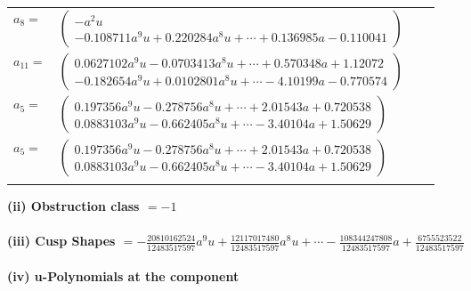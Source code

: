 \documentclass[1p]{elsarticle_modified}
\theoremstyle{definition}
\begin{document}
\begin{tabular}{m{7pt} m{180pt} m{7pt} m{180pt} }
\flushright $a_{8}=$&$\begin{pmatrix}- a^2 u\\-0.108711 a^{9} u+0.220284 a^{8} u+\cdots+0.136985 a-0.110041\end{pmatrix}$ \\
\flushright $a_{11}=$&$\begin{pmatrix}0.0627102 a^{9} u-0.0703413 a^{8} u+\cdots+0.570348 a+1.12072\\-0.182654 a^{9} u+0.0102801 a^{8} u+\cdots-4.10199 a-0.770574\end{pmatrix}$ \\
\flushright $a_{5}=$&$\begin{pmatrix}0.197356 a^{9} u-0.278756 a^{8} u+\cdots+2.01543 a+0.720538\\0.0883103 a^{9} u-0.662405 a^{8} u+\cdots-3.40104 a+1.50629\end{pmatrix}$\\ \flushright $a_{5}=$&$\begin{pmatrix}0.197356 a^{9} u-0.278756 a^{8} u+\cdots+2.01543 a+0.720538\\0.0883103 a^{9} u-0.662405 a^{8} u+\cdots-3.40104 a+1.50629\end{pmatrix}$\\&\end{tabular}
\flushleft \textbf{(ii) Obstruction class $= -1$}\\~\\
\flushleft \textbf{(iii) Cusp Shapes $= -\frac{20810162524}{12483517597} a^9 u+\frac{12117017480}{12483517597} a^8 u+\cdots-\frac{108344247808}{12483517597} a+\frac{6755523522}{12483517597}$}\\~\\
\newpage\renewcommand{\arraystretch}{1}
\flushleft \textbf{(iv) u-Polynomials at the component}\newline \\
\end{document}
